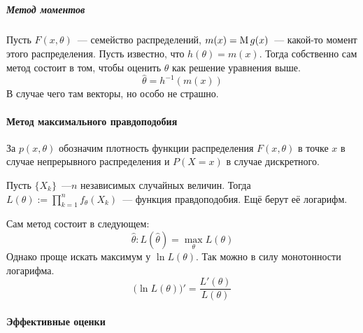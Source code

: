 \documentclass[12pt,ebook]{../../../notes}
\begin{document}
\subparagraph{}
\subparagraph{Метод моментов}

\begin{defn}\label{defn:stat:mom:method}

  Пусть $F(x,\theta)$~--- семейство распределений, $m(x) = \operatorname{M} g(x)$~--- какой-то момент этого
  распределения. Пусть известно, что $h(\theta) = m(x)$. Тогда собственно сам метод состоит в том,
  чтобы оценить $\theta$ как решение уравнения выше.
  \[
    \hat \theta = h^{-1} (m(x))
  \]
  В случае чего там векторы, но особо не страшно.

\end{defn}

\begin{exmp}\label{exmp:stat::mom::norm}
\end{exmp}

\paragraph{Метод максимального правдоподобия}
\label{par:stat::maklike}

\begin{defn}\label{defn:stat::maxlike::dens}
  За $p(x,\theta) $ обозначим плотность функции распределения $F(x,\theta)$ в точке $x$ в случае
  непрерывного распределения и $P(X=x)$ в случае дискретного.
\end{defn}
\begin{defn}\label{defn:stat::maxlike::fun}
  Пусть $\{X_k\}$~---$n$ независимых случайных величин. Тогда
  $\displaystyle L(\theta):= \prod_{k=1}^n f_\theta(X_k)$~--- функция правдоподобия.
  Ещё берут её логарифм.
\end{defn}

\begin{defn}\label{defn:stat::maxlike::method}
  Сам метод состоит в следующем:
  \[
    \hat \theta \colon L(\hat \theta) = \max_\theta L (\theta)
  \]
  Однако проще искать максимум у $\ln L(\theta)$. Так можно в силу монотонности логарифма.
  \[
    \bigl( \ln L (\theta)\bigr)' = \frac{L'(\theta)}{L(\theta)} 
  \]
\end{defn}



\paragraph*{Эффективные оценки}\label{par:stat::eff}
\end{document}
